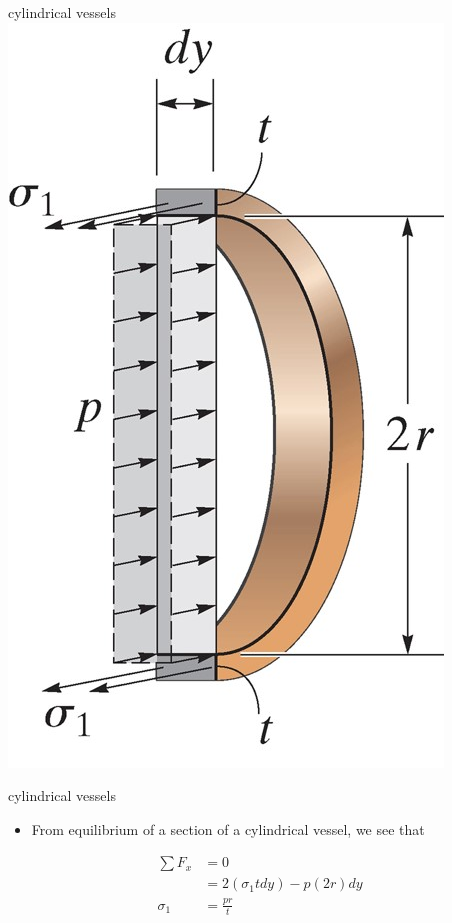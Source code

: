 \documentclass[
  letterpaper,
  ignorenonframetext,
  aspectratio=43,
  handout,
  12pt]{beamer}
\providecommand{\tightlist}{%
  \setlength{\itemsep}{0pt}\setlength{\parskip}{0pt}}
\providecommand{\tightlist}{%
\setlength{\itemsep}{0pt}\setlength{\parskip}{0pt}}
\let\Oldincludegraphics\includegraphics
\renewcommand{\includegraphics}[2][]{\Oldincludegraphics[width=\textwidth,height=0.7\textheight,keepaspectratio]{#2}}
\begin{document}
\begin{frame}{cylindrical vessels}
\protect\hypertarget{cylindrical-vessels}{}
\includegraphics{../images/cylinder-slice.jpg}
\end{frame}

\begin{frame}{cylindrical vessels}
\protect\hypertarget{cylindrical-vessels-1}{}
\begin{itemize}
\tightlist
\item
  From equilibrium of a section of a cylindrical vessel, we see that
\end{itemize}

\[\begin{aligned}
  \sum F_x &= 0\\
  &= 2(\sigma_1 t dy) - p (2r) dy\\
  \sigma_1 &= \frac{pr}{t}
\end{aligned}\]
\end{frame}
\end{document}
